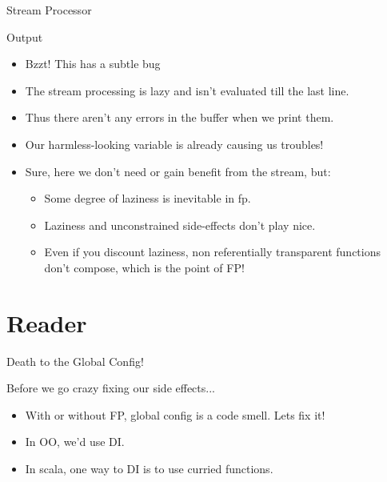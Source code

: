 \documentclass[professionalFonts,aspectratio=169]{beamer}
\begin{document}
\begin{frame}{Stream Processor}



\end{frame}

\begin{frame}{Output}



\begin{itemize}
\pause \item Bzzt! This has a subtle bug
\pause \item The stream processing is lazy and isn't evaluated till the last line.
\pause \item Thus there aren't any errors in the buffer when we print them.
\pause \item Our harmless-looking variable is already causing us troubles!
\pause \item Sure, here we don't need or gain benefit from the stream, but:
  \begin{itemize}
    \pause \item Some degree of laziness is inevitable in fp.
    \pause \item Laziness and unconstrained side-effects don't play nice.
    \pause \item Even if you discount laziness, non referentially transparent functions don't compose, which is the point of FP!
  \end{itemize}
\end{itemize}

\end{frame}

\section{Reader}

\begin{frame}{Death to the Global Config!}

Before we go crazy fixing our side effects...

\begin{itemize}
\item With or without FP, global config is a code smell. Lets fix it!
\pause \item In OO, we'd use DI. 
\pause \item In scala, one way to DI is to use curried functions.
\end{itemize}

\end{frame}
\end{document}
